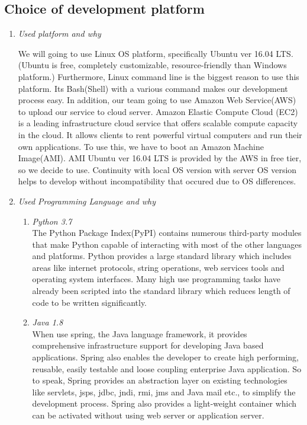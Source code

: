 \documentclass[conference]{IEEEtran}
\begin{document}
\subsection{Choice of development platform}
\begin{enumerate}
  \item 
  \textit{Used platform and why}
    
We will going to use Linux OS platform, specifically Ubuntu ver 16.04 LTS.  (Ubuntu is free, completely customizable, resource-friendly than Windows platform.) Furthermore, Linux command line is the biggest reason to use this platform. Its Bash(Shell) with a various command makes our development process easy.
In addition, our team going to use Amazon Web Service(AWS) to upload our service to cloud server. Amazon Elastic Compute Cloud (EC2) is a leading infrastructure cloud service that offers scalable compute capacity in the cloud. It allows clients to rent powerful virtual computers and run their own applications. To use this, we have to boot an Amazon Machine Image(AMI). AMI Ubuntu ver 16.04 LTS is provided by the AWS in free tier, so we decide to use. Continuity with local OS version with server OS version helps to develop without incompatibility that occured due to OS differences.
\\
  
   \item \textit{Used Programming Language and why}
       \begin{enumerate}
        \item \textit{Python 3.7}
\\The Python Package Index(PyPI) contains numerous third-party modules that make Python capable of interacting with most of the other languages and platforms. Python provides a large standard library which includes areas like internet protocols, string operations, web services tools and operating system interfaces. Many high use programming tasks have already been scripted into the standard library which reduces length of code to be written significantly.\\
 
        \item \textit{Java 1.8}
 \\When use spring, the Java language framework, it provides comprehensive infrastructure support for developing Java based applications. Spring also enables the developer to create high performing, reusable, easily testable and loose coupling enterprise Java application. So to speak, Spring provides an abstraction layer on existing technologies like servlets, jsps, jdbc, jndi, rmi, jms and Java mail etc., to simplify the development process. Spring also provides a light-weight container which can be activated without using web server or application server.\\
    

\end{enumerate}
\end{enumerate}
\end{document}
